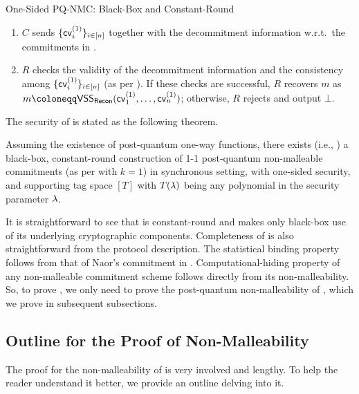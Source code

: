\begin{ProtocolBox}[label={protocol:BB-NMCom}]{One-Sided PQ-NMC: Black-Box and Constant-Round}
\begin{enumerate}
\item
$C$ sends $\{\mathsf{cv}^{(1)}_i\}_{i\in [n]}$ together with the decommitment information w.r.t.\ the commitments in . 
\item
$R$ checks the validity of the decommitment information and the consistency among $\{\mathsf{cv}^{(1)}_i\}_{i\in [n]}$ (as per ). If these checks are successful, $R$ recovers $m$ as $m \coloneqq \VSS_\Recon(\msf{cv}^{(1)}_1, \ldots, \msf{cv}^{(1)}_n)$; otherwise, $R$ rejects and output $\bot$. 
\end{enumerate}

\end{ProtocolBox}

 The security of  is stated as the following theorem.
\begin{theorem}\label{thm:one-sided:non-malleability}
 Assuming the existence of post-quantum one-way functions, there exists (i.e., ) a black-box, constant-round construction of 1-1 post-quantum non-malleable commitments (as per  with $k=1$) in synchronous setting, with one-sided security, and supporting tag space $[T]$ with $T(\lambda)$ being any polynomial in the security parameter $\lambda$.
\end{theorem}   
It is straightforward to see that  is constant-round and makes only black-box use of its underlying cryptographic components. Completeness of  is also straightforward from the protocol description. The statistical binding property follows from that of Naor's commitment in . Computational-hiding property of any non-malleable commitment scheme follows directly from its non-malleability. So, to prove , we only need to prove the post-quantum non-malleability of , which we prove in subsequent subsections.

\subsection{Outline for the Proof of Non-Malleability}
\label{sec:BB-PQNMC:1-1:proof:outline}
The proof for the non-malleability of  is very involved and lengthy. To help the reader understand it better, we provide an outline delving into it.

